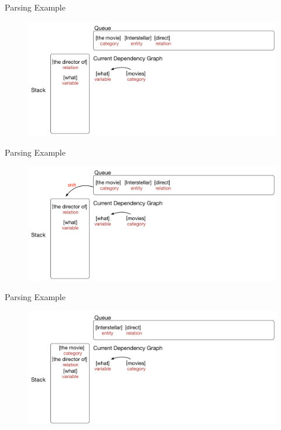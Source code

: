 \documentclass{beamer}
\begin{document}
\begin{frame}{Parsing Example}
	\begin{figure}
		\centering\includegraphics[width=1.0\textwidth]{introduction/parsing_examples/14.pdf}
	\end{figure}	
\end{frame}

\begin{frame}{Parsing Example}
	\begin{figure}
		\centering\includegraphics[width=1.0\textwidth]{introduction/parsing_examples/15.pdf}
	\end{figure}	
\end{frame}

\begin{frame}{Parsing Example}
	\begin{figure}
		\centering\includegraphics[width=1.0\textwidth]{introduction/parsing_examples/16.pdf}
	\end{figure}	
\end{frame}
\end{document}
